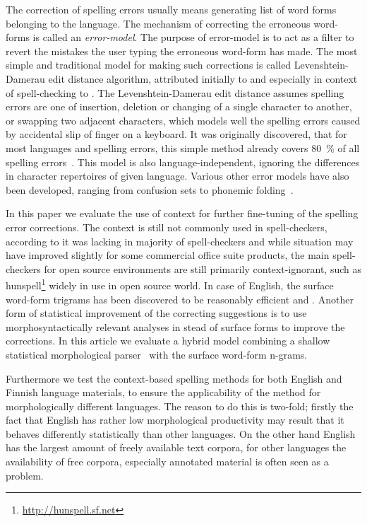 \documentclass[11pt,a4paper]{article}
\begin{document}
The correction of spelling errors usually means generating list of word forms
belonging to the language. The mechanism of correcting the erroneous word-forms
is called an \emph{error-model}. The purpose of error-model is to act as a
filter to revert the mistakes the user typing the erroneous word-form has made.
The most simple and traditional model for making such corrections is called
Levenshtein-Damerau edit distance algorithm, attributed initially to
 and especially in context of spell-checking to
. The Levenshtein-Damerau edit distance assumes spelling
errors are one of insertion, deletion or changing of a single character to
another, or swapping two adjacent characters, which models well the spelling
errors caused by accidental slip of finger on a keyboard. It was originally
discovered, that for most languages and spelling errors, this simple method
already covers 80~\% of all spelling errors~\cite{damerau/1964}. This model is
also language-independent, ignoring the differences in character repertoires of
given language. Various other error models have also been developed, ranging
from confusion sets to phonemic folding~\cite{kukich/1992}.

In this paper we evaluate the use of context for further fine-tuning of the
spelling error corrections. The context is still not commonly used in
spell-checkers, according to  it was lacking in majority
of spell-checkers and while situation may have improved slightly for some
commercial office suite products, the main spell-checkers for open source
environments are still primarily context-ignorant, such as
hunspell\footnote{\url{http://hunspell.sf.net}} widely in use in open source
world.  In case of English, the surface word-form trigrams has been discovered
to be reasonably efficient  and
. Another form of statistical
improvement of the correcting suggestions is to use morphosyntactically
relevant analyses in stead of surface forms to improve the corrections. In this
article we evaluate a hybrid model combining a shallow statistical
morphological parser~\cite{silfverberg/2010} with the surface word-form
n-grams.

Furthermore we test the context-based spelling methods for both English and
Finnish language materials, to ensure the applicability of the method for
morphologically different languages. The reason to do this is two-fold; firstly
the fact that English has rather low morphological productivity may result that
it behaves differently statistically than other languages. On the other hand
English has the largest amount of freely available text corpora, for other
languages the availability of free corpora, especially annotated material is
often seen as a problem.
\end{document}
